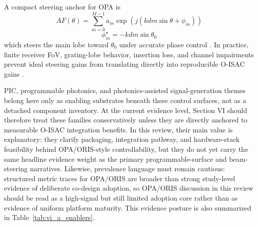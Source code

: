 \documentclass[lettersize,journal]{IEEEtran}
\begin{document}
A compact steering anchor for OPA is
\begin{equation}
AF(\theta)=\sum_{m=0}^{M-1} a_m\exp\!\left(j\left(kdm\sin\theta+\phi_m\right)\right)
\end{equation}
\begin{equation}
\phi_m^{\star}=-kdm\sin\theta_0
\end{equation}
which steers the main lobe toward $\theta_0$ under accurate phase control \cite{O_ISAC_008,O_ISAC_061,O_ISAC_091}. In practice, finite receiver FoV, grating-lobe behavior, insertion loss, and channel impairments prevent ideal steering gains from translating directly into reproducible O-ISAC gains \cite{O_ISAC_061,O_ISAC_091,O_ISAC_098}.

PIC, programmable photonics, and photonics-assisted signal-generation themes belong here only as enabling substrates beneath these control surfaces, not as a detached component inventory. At the current evidence level, Section VI should therefore treat these families conservatively unless they are directly anchored to measurable O-ISAC integration benefits. In this review, their main value is explanatory: they clarify packaging, integration pathway, and hardware-stack feasibility behind OPA/ORIS-style controllability, but they do not yet carry the same headline evidence weight as the primary programmable-surface and beam-steering narratives. Likewise, prevalence language must remain cautious: structured metric traces for OPA/ORIS are broader than strong study-level evidence of deliberate co-design adoption, so OPA/ORIS discussion in this review should be read as a high-signal but still limited adoption core rather than as evidence of uniform platform maturity. This evidence posture is also summarized in Table~\ref{tab:vi_a_enablers}.
\end{document}
